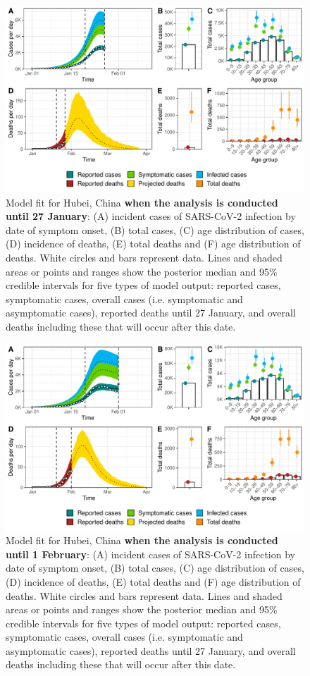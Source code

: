 \documentclass{article}
\begin{document}
\begin{figure}[H]
	\includegraphics[width=\linewidth]{../format_output/figures_v3/supp_fit_16F27.pdf}
	\caption{Model fit for Hubei, China \textbf{when the analysis is conducted until 27 January}: (A) incident cases of SARS-CoV-2 infection by date of symptom onset, (B) total cases, (C) age distribution of cases, (D) incidence of deaths, (E) total deaths and (F) age distribution of deaths. White circles and bars represent data. Lines and shaded areas or points and ranges show the posterior median and 95\% credible intervals for five types of model output: reported cases, symptomatic cases, overall cases (i.e. symptomatic and asymptomatic cases), reported deaths until 27 January, and overall deaths including these that will occur after this date.}
\end{figure}
\begin{figure}[H]
\includegraphics[width=\linewidth]{../format_output/figures_v3/supp_fit_16F32.pdf}
\caption{Model fit for Hubei, China \textbf{when the analysis is conducted until 1 February}: (A) incident cases of SARS-CoV-2 infection by date of symptom onset, (B) total cases, (C) age distribution of cases, (D) incidence of deaths, (E) total deaths and (F) age distribution of deaths. White circles and bars represent data. Lines and shaded areas or points and ranges show the posterior median and 95\% credible intervals for five types of model output: reported cases, symptomatic cases, overall cases (i.e. symptomatic and asymptomatic cases), reported deaths until 27 January, and overall deaths including these that will occur after this date.}
\end{figure}
\end{document}
